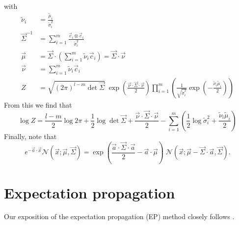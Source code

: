 \documentclass[11pt,twoside]{report}
\begin{document}
with
\begin{subequations}
\begin{align}
  \tilde{\nu}_i &= \frac{\tilde{\mu}_i}{\tilde{\sigma}_i^2} \\
  \vec{\Sigma}^{-1} &= \sum_{i=1}^m \frac{\vec{c}_i \otimes \vec{c}_i}{\tilde{\sigma}_i^2}
  \label{eq:combined-normals-sigma}
  \\
  \vec{\mu} &=
  \vec{\Sigma} \cdot \left( \sum_{i=1}^m \tilde{\nu}_i \vec{c}_i \right)
  = \vec{\Sigma} \cdot \vec{\nu}
  \\
  \vec{\nu} &= \sum_{i=1}^m \tilde{\nu}_i \vec{c}_i
  \label{eq:combined-normals-nu}
  \\
  Z &=
  \sqrt{ (2\pi)^{l-m} \det{\vec{\Sigma}} }
  \;
  \exp{\left( \frac{\vec{\nu} \cdot \vec{\Sigma} \cdot \vec{\nu}}{2} \right)}
  \prod_{i=1}^m
  \left(
  \frac{1}{\sqrt{ \tilde{\sigma}_i^2 }}
  \exp{\left(-\frac{\tilde{\nu}_i \tilde{\mu}_i}{2}\right)}
  \right)
  \label{eq:combined-normals-Z}
\end{align}
\end{subequations}
From this we find that
\begin{equation}
  \log{Z} =
  \frac{l-m}{2} \log{2\pi} +
  \frac{1}{2} \log\det{\vec{\Sigma}} +
  \frac{\vec{\nu} \cdot \vec{\Sigma} \cdot \vec{\nu}}{2} -
  \sum_{i=1}^m
  \left(
  \frac{1}{2} \log{\tilde{\sigma}_i^2} +
  \frac{\tilde{\nu}_i \tilde{\mu}_i}{2}
  \right)
\end{equation}
Finally, note that
\begin{equation}\label{eq:biased-normal}
  e^{-\vec{a} \cdot \vec{x}} \mathcal{N}(\vec{x}; \vec{\mu}, \vec{\Sigma})
  =
  \exp{\left( \frac{\vec{a} \cdot \vec{\Sigma} \cdot \vec{a}}{2} - \vec{a} \cdot \vec{\mu} \right)} \;
  \mathcal{N}(\vec{x}; \vec{\mu} - \vec{\Sigma}\cdot\vec{a}, \vec{\Sigma}).
\end{equation}


\section{Expectation propagation}
\label{sec:ep-integration}

Our exposition of the expectation propagation (EP) method closely follows \cite{Cunningham2011}.
\end{document}
